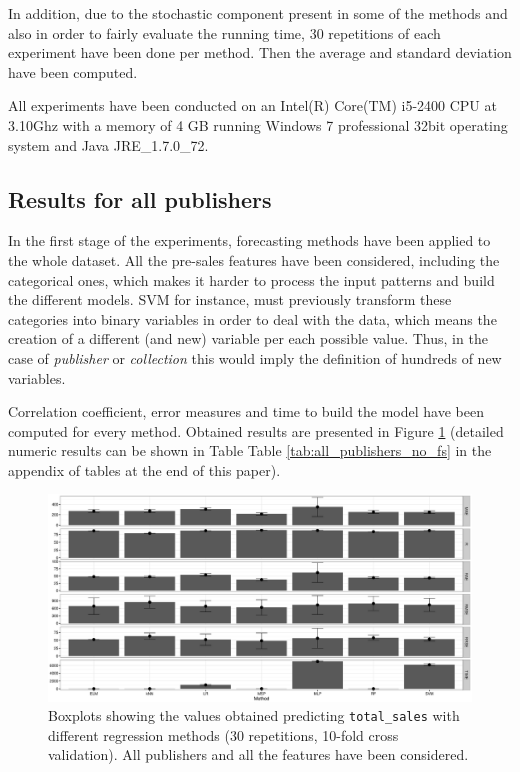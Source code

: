 \documentclass[a4paper,10pt,twocolumn,preprint,3p]{elsarticle}
\begin{document}
In addition, due to the stochastic component present in some of the methods and also in order to fairly evaluate the running time, 30 repetitions of each experiment have been done per method. Then the average and standard deviation have been computed.

All experiments have been conducted on an  Intel(R) Core(TM) i5-2400 CPU at 3.10Ghz with a memory of 4 GB running Windows 7 professional 32bit operating system and Java JRE\_1.7.0\_72.



\subsection{Results for all publishers}
\label{subsec:results_all_publishers}

In the first stage of the experiments, forecasting methods have been
applied to the whole dataset. All the pre-sales features have been
considered, including the categorical ones, which makes it harder to
process the input patterns and build the different models. SVM for
instance, must previously transform these categories into binary
variables in order to deal with the data, which means the creation of
a different (and new) variable per each possible value. Thus, in the
case of \emph{publisher} or \emph{collection} this would imply the definition of
hundreds of new variables. 

Correlation coefficient, error measures and time to build the model have been 
computed for every method. Obtained results are presented in 
Figure \ref{fig:all_publishers_no_fs}
(detailed numeric results can be shown in Table Table \ref{tab:all_publishers_no_fs}
in the appendix of tables at the end of this paper).

\begin{figure}[ht]
\begin{center}
\includegraphics[scale=0.4]{./imgs/prediction_all_publisher_all_features_Table3.eps}
\end{center}
\caption{Boxplots showing the values obtained predicting \texttt{total\_sales} with different regression methods (30 repetitions, 10-fold cross validation). All publishers and all the features have been considered.}
\label{fig:all_publishers_no_fs}
\end{figure}
\end{document}
